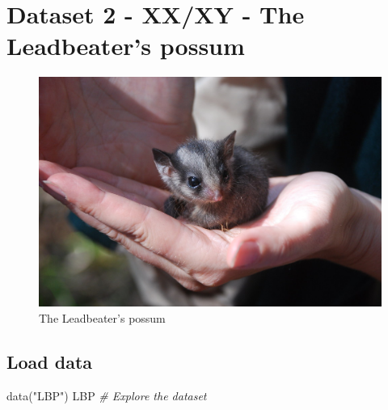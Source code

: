 \documentclass[
  letterpaper,
  DIV=11,
  numbers=noendperiod]{scrreprt}
\newenvironment{Shaded}{\begin{snugshade}}{\end{snugshade}}
\newcommand{\CommentTok}[1]{\textcolor[rgb]{0.38,0.63,0.69}{\textit{#1}}}
\newcommand{\FunctionTok}[1]{\textcolor[rgb]{0.02,0.16,0.49}{#1}}
\newcommand{\NormalTok}[1]{\textcolor[rgb]{0.00,0.44,0.13}{#1}}
\newcommand{\StringTok}[1]{\textcolor[rgb]{0.25,0.44,0.63}{#1}}
\begin{document}

\hypertarget{dataset-2---xxxy---the-leadbeaters-possum}{%
\chapter*{Dataset 2 - XX/XY - The Leadbeater's
possum}\label{dataset-2---xxxy---the-leadbeaters-possum}}


\begin{figure}

{\centering \includegraphics{images/Leadbeaters_possum.jpg}

}

\caption{The Leadbeater's possum}

\end{figure}

\hypertarget{load-data-1}{%
\section*{Load data}\label{load-data-1}}


\begin{Shaded}
\begin{Highlighting}[]
\FunctionTok{data}\NormalTok{(}\StringTok{"LBP"}\NormalTok{)}
\NormalTok{LBP  }\CommentTok{\# Explore the dataset}
\end{Highlighting}
\end{Shaded}
\end{document}
